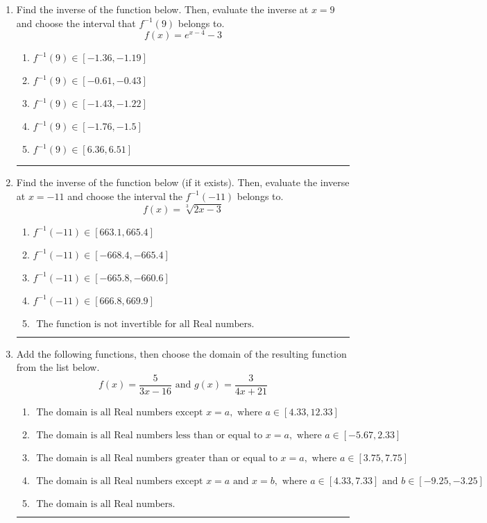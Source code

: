 \documentclass[14pt]{extbook}
\newcommand{\litem}[1]{\item#1\hspace*{-1cm}\rule{\textwidth}{0.4pt}}
\begin{document}
\begin{enumerate}
{\begin{enumerate}[label=\Alph*.]
\end{enumerate} }
\litem{
Find the inverse of the function below. Then, evaluate the inverse at $x = 9$ and choose the interval that $f^{-1}(9)$ belongs to.\[ f(x) = e^{x-4}-3 \]\begin{enumerate}[label=\Alph*.]
\item \( f^{-1}(9) \in [-1.36, -1.19] \)
\item \( f^{-1}(9) \in [-0.61, -0.43] \)
\item \( f^{-1}(9) \in [-1.43, -1.22] \)
\item \( f^{-1}(9) \in [-1.76, -1.5] \)
\item \( f^{-1}(9) \in [6.36, 6.51] \)

\end{enumerate} }
\litem{
Find the inverse of the function below (if it exists). Then, evaluate the inverse at $x = -11$ and choose the interval the $f^{-1}(-11)$ belongs to.\[ f(x) = \sqrt[3]{2 x - 3} \]\begin{enumerate}[label=\Alph*.]
\item \( f^{-1}(-11) \in [663.1, 665.4] \)
\item \( f^{-1}(-11) \in [-668.4, -665.4] \)
\item \( f^{-1}(-11) \in [-665.8, -660.6] \)
\item \( f^{-1}(-11) \in [666.8, 669.9] \)
\item \( \text{ The function is not invertible for all Real numbers. } \)

\end{enumerate} }
\litem{
Add the following functions, then choose the domain of the resulting function from the list below.\[ f(x) = \frac{5}{3x-16} \text{ and } g(x) = \frac{3}{4x+21} \]\begin{enumerate}[label=\Alph*.]
\item \( \text{ The domain is all Real numbers except } x = a, \text{ where } a \in [4.33, 12.33] \)
\item \( \text{ The domain is all Real numbers less than or equal to } x = a, \text{ where } a \in [-5.67, 2.33] \)
\item \( \text{ The domain is all Real numbers greater than or equal to } x = a, \text{ where } a \in [3.75, 7.75] \)
\item \( \text{ The domain is all Real numbers except } x = a \text{ and } x = b, \text{ where } a \in [4.33, 7.33] \text{ and } b \in [-9.25, -3.25] \)
\item \( \text{ The domain is all Real numbers. } \)


\end{enumerate}}
\end{enumerate}
\end{document}
